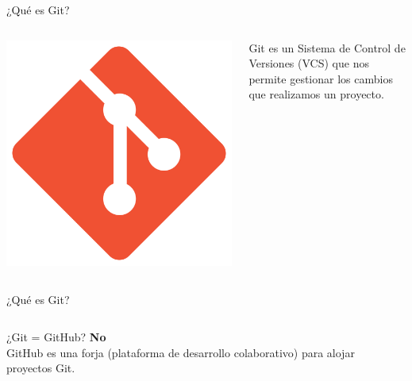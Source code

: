 \begin{frame}{¿Qué es Git?}
  \begin{columns}[onlytextwidth]
    \begin{center}
      \includegraphics[scale=0.07]{images/logoGit2}
    \end{center}
    Git es un Sistema de Control de Versiones (VCS) que nos permite gestionar los cambios que realizamos un proyecto.
  \end{columns}
\end{frame}

\begin{frame}{¿Qué es Git?}
  \begin{columns}[onlytextwidth]
    \alert{\Large ¿Git = GitHub? {\color{solarized-red} \textbf{No}}} \\
    GitHub es una forja (plataforma de desarrollo colaborativo) para alojar proyectos Git.
    \begin{center}
    \end{center}
  \end{columns}
\end{frame}

